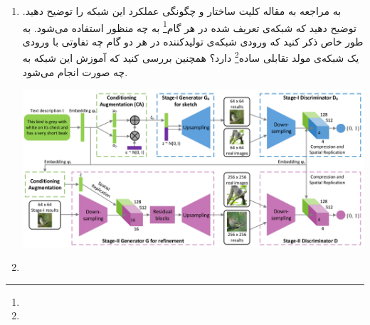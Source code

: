 \begin{enumerate}
	\item
	به مراجعه به مقاله \href{https://arxiv.org/abs/1612.03242}{\textcolor{magenta}{}} کلیت ساختار و چگونگی عملکرد این شبکه را توضیح دهید. توضیح دهید که شبکه‌ی تعریف شده در هر گام\footnote{} به چه منظور استفاده می‌شود. به طور خاص ذکر کنید که ورودی شبکه‌ی تولیدکننده در هر دو گام چه تفاوتی با ورودی یک شبکه‌ی مولد تقابلی ساده\footnote{} دارد؟ همچنین بررسی کنید که آموزش این شبکه به چه صورت انجام می‌شود.
	
	\begin{center}
		\includegraphics*[width=0.9\linewidth]{pics/img1.png}
		\label{معماری کلی شبکه مولد تقابلی پشته ای}
	\end{center}
	
	\begin{qsolve}
		 
	\end{qsolve}
	
	
	
	
	\item 
	
	
	
	
	
	
\end{enumerate}


























